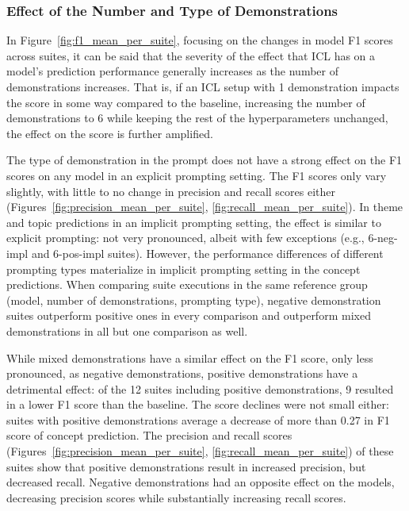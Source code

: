 \documentclass[english, 12pt, a4paper, sci, utf8, a-2b, online]{latex/definitions/aaltothesis}
\begin{document}
\subsubsection{Effect of the Number and Type of Demonstrations} \label{sec:effect_icl_types} %

In Figure~\ref{fig:f1_mean_per_suite}, focusing on the changes in model F1 scores across suites, it can be said that the severity of the effect that ICL has on a model's prediction performance generally increases as the number of demonstrations increases. That is, if an ICL setup with 1 demonstration impacts the score in some way compared to the baseline, increasing the number of demonstrations to 6 while keeping the rest of the hyperparameters unchanged, the effect on the score is further amplified.

The type of demonstration in the prompt does not have a strong effect on the F1 scores on any model in an explicit prompting setting. The F1 scores only vary slightly, with little to no change in precision and recall scores either (Figures~\ref{fig:precision_mean_per_suite}, \ref{fig:recall_mean_per_suite}). In theme and topic predictions in an implicit prompting setting, the effect is similar to explicit prompting: not very pronounced, albeit with few exceptions (e.g., 6-neg-impl and 6-pos-impl suites). However, the performance differences of different prompting types materialize in implicit prompting setting in the concept predictions. When comparing suite executions in the same reference group (model, number of demonstrations, prompting type), negative demonstration suites outperform positive ones in every comparison and outperform mixed demonstrations in all but one comparison as well.

While mixed demonstrations have a similar effect on the F1 score, only less pronounced, as negative demonstrations, positive demonstrations have a detrimental effect: of the 12 suites including positive demonstrations, 9 resulted in a lower F1 score than the baseline. The score declines were not small either: suites with positive demonstrations average a decrease of more than 0.27 in F1 score of concept prediction. The precision and recall scores (Figures~\ref{fig:precision_mean_per_suite}, \ref{fig:recall_mean_per_suite}) of these suites show that positive demonstrations result in increased precision, but decreased recall. Negative demonstrations had an opposite effect on the models, decreasing precision scores while substantially increasing recall scores.
\end{document}
